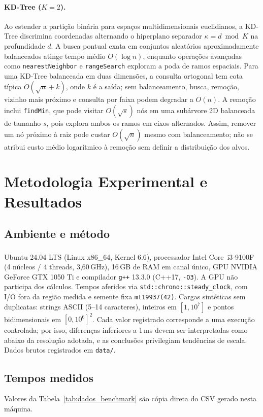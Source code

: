 \documentclass[11pt, a4paper]{article}
\begin{document}
\paragraph{KD-Tree ($K=2$).}
Ao estender a partição binária para espaços multidimensionais euclidianos, a KD-Tree discrimina coordenadas alternando o hiperplano separador $\kappa = d \bmod K$ na profundidade $d$. A busca pontual exata em conjuntos aleatórios aproximadamente balanceados atinge tempo médio $O(\log n)$, enquanto operações avançadas como \texttt{nearestNeighbor} e \texttt{rangeSearch} exploram a poda de ramos espaciais. Para uma KD-Tree balanceada em duas dimensões, a consulta ortogonal tem cota típica $O(\sqrt{n}+k)$, onde $k$ é a saída; sem balanceamento, busca, remoção, vizinho mais próximo e consulta por faixa podem degradar a $O(n)$. A remoção inclui \texttt{findMin}, que pode visitar $O(\sqrt{s})$ nós em uma subárvore 2D balanceada de tamanho $s$, pois explora ambos os ramos em eixos alternados. Assim, remover um nó próximo à raiz pode custar $O(\sqrt{n})$ mesmo com balanceamento; não se atribui custo médio logarítmico à remoção sem definir a distribuição dos alvos.

\section{Metodologia Experimental e Resultados}

\subsection{Ambiente e método}
Ubuntu 24.04 LTS (Linux x86\_64, Kernel 6.6), processador Intel\textsuperscript{\textregistered} Core\texttrademark\ i3-9100F (4 núcleos / 4 threads, 3{,}60\,GHz), 16\,GB de RAM em canal único, GPU NVIDIA GeForce GTX 1050 Ti e compilador \texttt{g++} 13.3.0 (C++17, \texttt{-O3}). A GPU não participa dos cálculos. Tempos aferidos via \texttt{std::chrono::}\allowbreak\texttt{steady\_clock}, com I/O fora da região medida e semente fixa \texttt{mt19937(42)}. Cargas sintéticas sem duplicatas: strings ASCII (5--14 caracteres), inteiros em $[1, 10^{7}]$ e pontos bidimensionais em $[0, 10^{6}]^{2}$. Cada valor registrado corresponde a uma execução controlada; por isso, diferenças inferiores a 1\,ms devem ser interpretadas como abaixo da resolução adotada, e as conclusões privilegiam tendências de escala. Dados brutos registrados em \texttt{data/}.

\subsection{Tempos medidos}
Valores da Tabela~\ref{tab:dados_benchmark} são cópia direta do CSV gerado nesta máquina.
\end{document}
